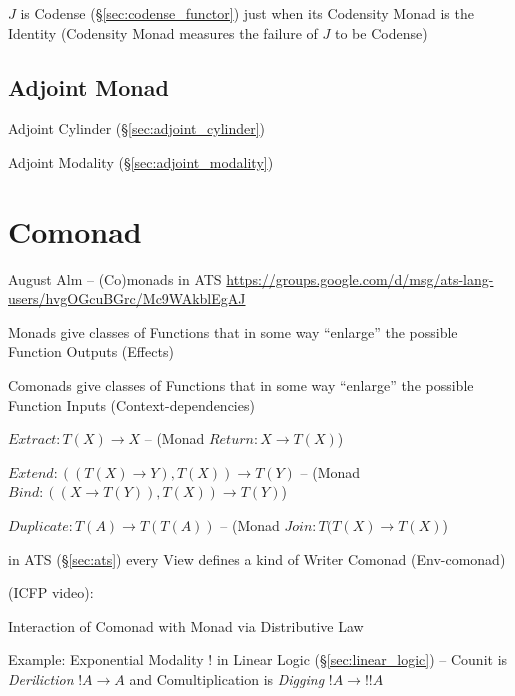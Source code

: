 $J$ is Codense (\S\ref{sec:codense_functor}) just when its Codensity
Monad is the Identity (Codensity Monad measures the failure of $J$ to
be Codense)



\subsection{Adjoint Monad}\label{sec:adjoint_monad}

Adjoint Cylinder (\S\ref{sec:adjoint_cylinder})

Adjoint Modality (\S\ref{sec:adjoint_modality})



\section{Comonad}\label{sec:comonad}

\asterism


August Alm -- (Co)monads in ATS
\url{https://groups.google.com/d/msg/ats-lang-users/hvgOGcuBGrc/Mc9WAkblEgAJ}

Monads give classes of Functions that in some way ``enlarge'' the
possible Function Outputs (Effects)

Comonads give classes of Functions that in some way ``enlarge'' the
possible Function Inputs (Context-dependencies)

$Extract : T(X) \rightarrow X$ -- (Monad $Return : X \rightarrow
T(X)$)

$Extend : ((T(X) \rightarrow Y), T(X)) \rightarrow T(Y)$ -- (Monad
$Bind : ((X \rightarrow T(Y)), T(X)) \rightarrow T(Y)$)

$Duplicate : T(A) \rightarrow T(T(A))$ -- (Monad
$Join : T(T(X) \rightarrow T(X)$)

in ATS (\S\ref{sec:ats}) every View defines a kind of Writer Comonad
(Env-comonad)


\asterism


(ICFP video):

Interaction of Comonad with Monad via Distributive Law %

Example: Exponential Modality $!$ in Linear Logic
(\S\ref{sec:linear_logic}) -- Counit is \emph{Deriliction} $!A
\rightarrow A$ and Comultiplication is \emph{Digging} $!A \rightarrow
!!A$


